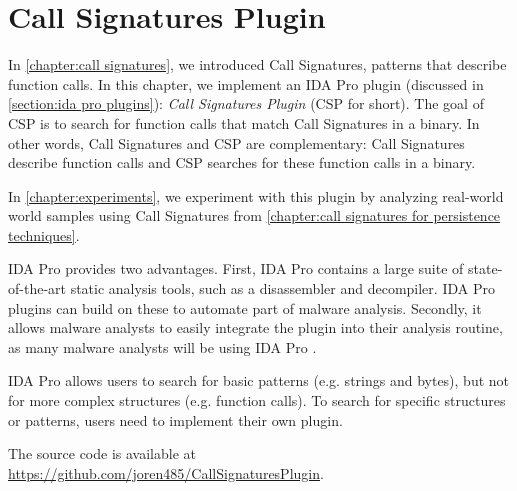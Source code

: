 \chapter{Call Signatures Plugin}\label{chapter:plugin}
In \autoref{chapter:call signatures}, we introduced Call Signatures, patterns that describe function calls. In this chapter, we implement an IDA Pro plugin (discussed in \autoref{section:ida pro plugins}): \emph{Call Signatures Plugin} (CSP for short). The goal of CSP is to search for function calls that match Call Signatures in a binary. In other words, Call Signatures and CSP are complementary: Call Signatures describe function calls and CSP searches for these function calls in a binary.

In \autoref{chapter:experiments}, we experiment with this plugin by analyzing real-world world samples using Call Signatures from \autoref{chapter:call signatures for persistence techniques}.

\medskip

IDA Pro provides two advantages. First, IDA Pro contains a large suite of state-of-the-art static analysis tools, such as a disassembler and decompiler. IDA Pro plugins can build on these to automate part of malware analysis. Secondly, it allows malware analysts to easily integrate the plugin into their analysis routine, as many malware analysts will be using IDA Pro \cite{ida_guide}.

IDA Pro allows users to search for basic patterns (e.g. strings and bytes), but not for more complex structures (e.g. function calls). To search for specific structures or patterns, users need to implement their own plugin.

\medskip

The source code is available at \url{https://github.com/joren485/CallSignaturesPlugin}.

\medskip

